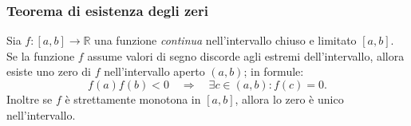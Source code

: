 \documentclass[x11names]{article}
\begin{document}
	\begin{center}
		\colorbox{myred}{\begin{minipage}{5.75in}
				\begin{redes}{}
					\subsubsection{Teorema di esistenza degli zeri}
					Sia $f:\left[a,b\right] \rightarrow \mathbb{R}$ una funzione \textit{continua} nell'intervallo chiuso e limitato $\left[a,b\right]$. Se la funzione $f$ assume valori di segno discorde agli estremi dell'intervallo, allora esiste uno zero  di $f$ nell'intervallo aperto $\left(a,b\right)$; in formule:
					\[
					f\left(a\right)f\left(b\right) < 0 \quad \Rightarrow \quad \exists c \in \left(a,b\right) : f\left(c\right) = 0
					.\] 
					Inoltre se $f$ è strettamente monotona in $\left[a,b\right]$, allora lo zero è unico nell'intervallo.
				\end{redes}
		\end{minipage}}        
	\end{center}
	\begin{center}
		
	\end{center}
	
\end{document}
